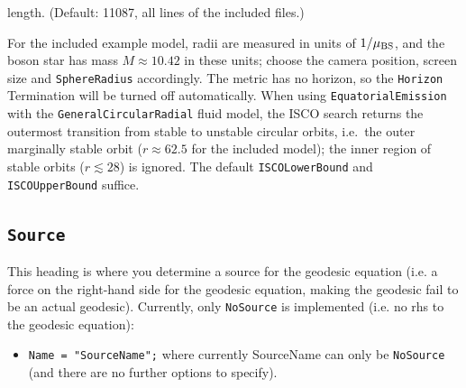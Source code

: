 \documentclass[11pt,a4paper]{article}
\newcommand{\code}[1]{{\tt #1}}
\begin{document}
\begin{itemize}
\begin{itemize}
length. (Default: 11087, all lines of the included files.)
\end{itemize}
For the included example model, radii are measured in units of $1/\mu_{\rm BS}$, and
the boson star has mass $M\approx 10.42$ in these units; choose the camera
position, screen size and \code{SphereRadius} accordingly. The metric has no
horizon, so the \code{Horizon} Termination will be turned off automatically. When using \code{EquatorialEmission} with the \code{GeneralCircularRadial} fluid model, the ISCO search returns the outermost transition from stable to unstable circular orbits, i.e.\ the outer marginally stable orbit ($r\approx62.5$ for the included model); the inner region of stable orbits ($r\lesssim28$) is ignored. The default \code{ISCOLowerBound} and \code{ISCOUpperBound} suffice.
\end{itemize}


\subsection{\code{Source}}
This heading is where you determine a source for the geodesic equation (i.e. a force on the right-hand side for the geodesic equation, making the geodesic fail to be an actual geodesic). Currently, only \code{NoSource} is implemented (i.e. no rhs to the geodesic equation):
\begin{itemize}
 \item \code{Name =  "SourceName";}\newline
 where currently SourceName can only be \code{NoSource} (and there are no further options to specify).
\end{itemize}
\end{document}
